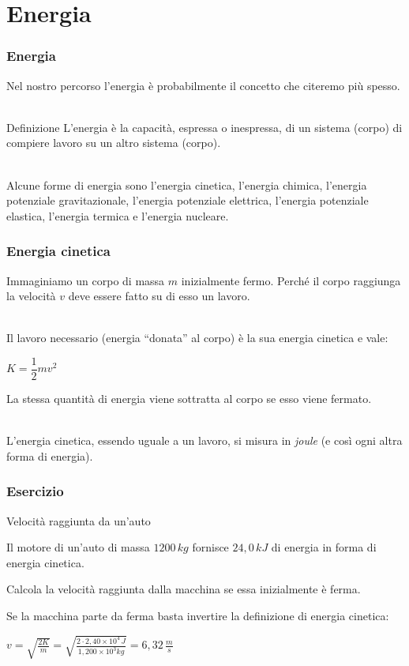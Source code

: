 \documentclass[]{beamer}
\theoremstyle{plain}
\begin{document}
\section{Energia}


\begin{frame}
  \frametitle{Energia}
Nel nostro percorso l'energia è probabilmente il concetto che citeremo più spesso.\\~\pause
\begin{block}{Definizione}
  L'energia è la capacità, espressa o inespressa, di un sistema (corpo) di compiere lavoro su un altro sistema (corpo).
\end{block}~\pause\\
Alcune forme di energia sono l'energia cinetica, l'energia chimica, l'energia potenziale gravitazionale, l'energia potenziale elettrica, l'energia potenziale elastica, l'energia termica e l'energia nucleare.
\end{frame}

\begin{frame}
\frametitle{Energia cinetica}
Immaginiamo un corpo di massa $ m $ inizialmente fermo. Perché il corpo raggiunga la velocità $ v $ deve essere fatto su di esso un lavoro.\\~\pause

Il lavoro necessario (energia ``donata'' al corpo) è la sua \alert{energia cinetica} e vale:
\begin{center}
\colorbox{marroncino!30}{$ K = \dfrac{1}{2}mv^2 $}
\end{center}
La stessa quantità di energia viene sottratta al corpo se esso viene fermato.\\~\pause

L'energia cinetica, essendo uguale a un lavoro, si misura in \emph{joule} (e così ogni altra forma di energia).
\end{frame}


\begin{frame}
  \frametitle{Esercizio}
  \begin{exampleblock}{Velocità raggiunta da un'auto}
\begin{small}
Il motore di un'auto di massa $ 1200 \, kg $ fornisce $ 24,0 \, kJ $ di energia in forma di energia cinetica.

Calcola la velocità raggiunta dalla macchina se essa inizialmente è ferma.
\end{small}
\end{exampleblock}
Se la macchina parte da ferma basta invertire la definizione di energia cinetica:
\begin{center}
  $ v = \sqrt{\frac{2K}{m}} = \sqrt{\frac{2 \cdot 2,40\times 10^4 \, J }{1,200 \times 10^3 kg}} = 6,32 \, \frac{m}{s}$
\end{center}
\end{frame}
\end{document}
